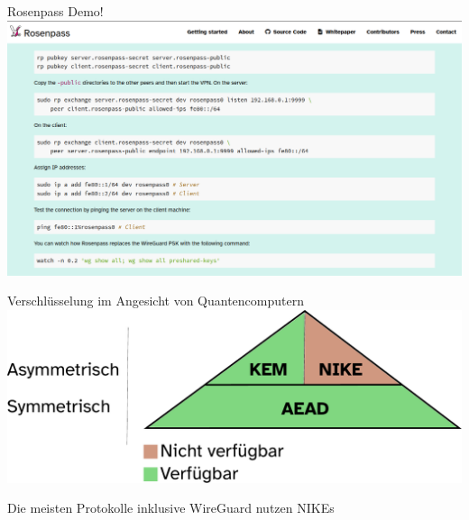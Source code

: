 \documentclass{rosenpass-beamer}
\begin{document}

\begin{frame}{Rosenpass Demo!}
  \includegraphics[height=.9\textheight]{assets/2023-03-20-rg-tutorial-screenshot.png}
\end{frame}


\begin{frame}{Verschlüsselung im Angesicht von Quantencomputern}
    \includegraphics[height=.6\textheight]{graphics/Primitivenpyramide.pdf}
      
    Die meisten Protokolle inklusive WireGuard nutzen NIKEs    
\end{frame}
\end{document}
